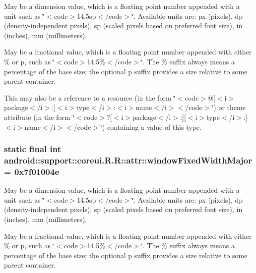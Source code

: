 May be a dimension value, which is a floating point number appended with a unit such as \char`\"{}$<$code$>$14.5sp$<$/code$>$\char`\"{}. Available units are: px (pixels), dp (density-independent pixels), sp (scaled pixels based on preferred font size), in (inches), mm (millimeters). 

May be a fractional value, which is a floating point number appended with either \% or p, such as \char`\"{}$<$code$>$14.5\%$<$/code$>$\char`\"{}. The \% suffix always means a percentage of the base size; the optional p suffix provides a size relative to some parent container. 

This may also be a reference to a resource (in the form \char`\"{}$<$code$>$@\mbox{[}$<$i$>$package$<$/i$>$:\mbox{]}$<$i$>$type$<$/i$>$:$<$i$>$name$<$/i$>$$<$/code$>$\char`\"{}) or theme attribute (in the form \char`\"{}$<$code$>$?\mbox{[}$<$i$>$package$<$/i$>$:\mbox{]}\mbox{[}$<$i$>$type$<$/i$>$:\mbox{]}$<$i$>$name$<$/i$>$$<$/code$>$\char`\"{}) containing a value of this type. \hypertarget{classandroid_1_1support_1_1coreui_1_1_r_1_1attr_2e4a1e117103f53e765c5e6455e33420}{
\subsubsection[{windowFixedWidthMajor}]{\setlength{\rightskip}{0pt plus 5cm}static final int android::support::coreui.R.R::attr::windowFixedWidthMajor = 0x7f01004e}}
\label{classandroid_1_1support_1_1coreui_1_1_r_1_1attr_2e4a1e117103f53e765c5e6455e33420}


May be a dimension value, which is a floating point number appended with a unit such as \char`\"{}$<$code$>$14.5sp$<$/code$>$\char`\"{}. Available units are: px (pixels), dp (density-independent pixels), sp (scaled pixels based on preferred font size), in (inches), mm (millimeters). 

May be a fractional value, which is a floating point number appended with either \% or p, such as \char`\"{}$<$code$>$14.5\%$<$/code$>$\char`\"{}. The \% suffix always means a percentage of the base size; the optional p suffix provides a size relative to some parent container. 

